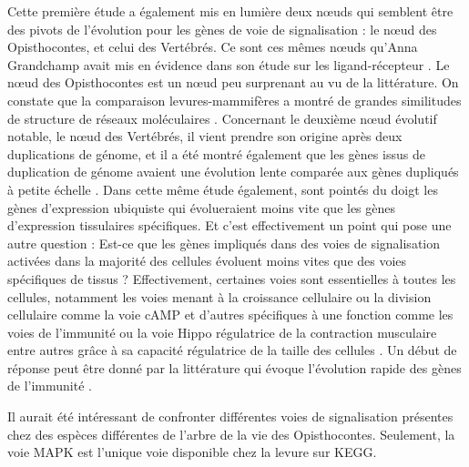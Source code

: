 \par Cette première étude a également mis en lumière deux nœuds qui semblent être des pivots de l’évolution pour les gènes de voie de signalisation : le nœud des Opisthocontes, et celui des Vertébrés. Ce sont ces mêmes nœuds qu’Anna Grandchamp avait mis en évidence dans son étude sur les ligand-récepteur \parencite{grandchamp_synchronous_2018}. Le nœud des Opisthocontes est un nœud peu surprenant au vu de la littérature. On constate que la comparaison levures-mammifères a montré de grandes similitudes de structure de réseaux moléculaires \parencite{cross_evolution_2011}. Concernant le deuxième nœud évolutif notable, le nœud des Vertébrés, il vient prendre son origine après deux duplications de génome, et il a été montré également que les gènes issus de duplication de génome avaient une évolution lente comparée aux gènes dupliqués à petite échelle \parencite{satake_evolution_2012}. Dans cette même étude également, sont pointés du doigt les gènes d’expression ubiquiste qui évolueraient moins vite que les gènes d’expression tissulaires spécifiques. Et c’est effectivement un point qui pose une autre question : Est-ce que les gènes impliqués dans des voies de signalisation activées dans la majorité des cellules évoluent moins vites que des voies spécifiques de tissus ? Effectivement, certaines voies sont essentielles à toutes les cellules, notamment les voies menant à la croissance cellulaire ou la division cellulaire comme la voie cAMP \parencite{sassone-corsi_cyclic_2012} et d’autres spécifiques à une fonction comme les voies de l’immunité ou la voie Hippo régulatrice de la contraction musculaire entre autres grâce à sa capacité régulatrice de la taille des cellules \parencite{zhao_hippo_2011}. Un début de réponse peut être donné par la littérature qui évoque l’évolution rapide des gènes de l'immunité \parencite{cooper_evolution_2006, schlesinger_coevolutionary_2014}. 
\par Il aurait été intéressant de confronter différentes voies de signalisation présentes chez des espèces différentes de l’arbre de la vie des Opisthocontes. Seulement, la voie MAPK est l’unique voie disponible chez la levure sur KEGG.
